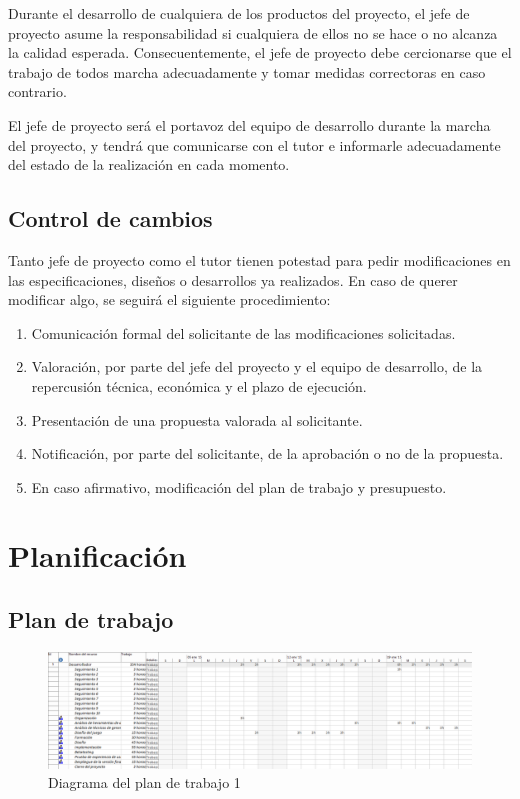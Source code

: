 			Durante el desarrollo de cualquiera de los productos del proyecto, el jefe de proyecto asume 	la responsabilidad si cualquiera de ellos no se hace o no alcanza la calidad esperada. 	Consecuentemente, el jefe de proyecto debe cercionarse que el trabajo de todos marcha 	adecuadamente y tomar medidas correctoras en caso contrario.

			El jefe de proyecto será el portavoz del equipo de desarrollo durante la marcha del proyecto, 	y tendrá que comunicarse con el tutor e informarle adecuadamente del estado de la 	realización en cada momento.

		\subsection{Control de cambios}

			Tanto jefe de proyecto como el tutor tienen potestad para pedir modificaciones en las 	especificaciones, diseños o desarrollos ya realizados. En caso de querer modificar algo, se 	seguirá el siguiente procedimiento:

			\begin{enumerate}
				\item Comunicación formal del solicitante de las modificaciones solicitadas.
				\item Valoración, por parte del jefe del proyecto y el equipo de desarrollo, de la repercusión 	técnica, económica y el plazo de ejecución.
				\item Presentación de una propuesta valorada al solicitante.
				\item Notificación, por parte del solicitante, de la aprobación o no de la propuesta.
				\item En caso afirmativo, modificación del plan de trabajo y presupuesto.
			\end{enumerate}
			\clearpage

	\section{Planificación}

		\subsection{Plan de trabajo}

			\begin{figure}[!htp]
				\centering
				\includegraphics[page=1, scale=.45, angle=90]{fig/Plan1}
				\caption{Diagrama del plan de trabajo 1}
			\end{figure}


